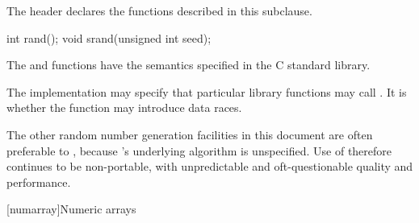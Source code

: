 \pnum
\begin{note}
The header 
declares the functions described in this subclause.
\end{note}

%
%
\begin{itemdecl}
int rand();
void srand(unsigned int seed);
\end{itemdecl}

\begin{itemdescr}
\pnum
\effects
The
 and 
functions have the semantics specified in the C standard library.

\pnum
\remarks
The implementation
may specify that particular library functions may call
.
It is 
whether the  function
may introduce data races.
\begin{note}
%
The other random
number generation facilities in this document are often preferable
to , because 's underlying algorithm is unspecified.
Use of  therefore continues to be non-portable, with unpredictable
and oft-questionable quality and performance.
\end{note}
\end{itemdescr}




[numarray]{Numeric arrays}

